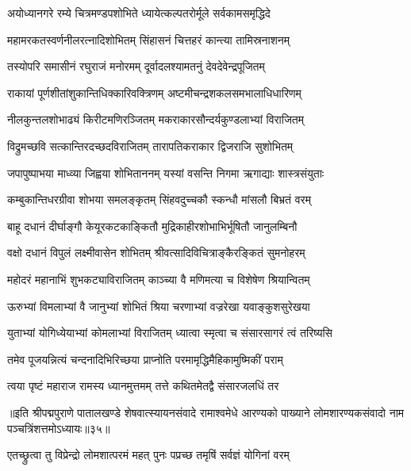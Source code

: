 \twolineshloka
{अयोध्यानगरे रम्ये चित्रमण्डपशोभिते}
{ध्यायेत्कल्पतरोर्मूले सर्वकामसमृद्धिदे}%

\twolineshloka
{महामरकतस्वर्णनीलरत्नादिशोभितम्}
{सिंहासनं चित्तहरं कान्त्या तामिस्रनाशनम्}%

\twolineshloka
{तस्योपरि समासीनं रघुराजं मनोरमम्}
{दूर्वादलश्यामतनुं देवदेवेन्द्रपूजितम्}%

\twolineshloka
{राकायां पूर्णशीतांशुकान्तिधिक्कारिवक्त्रिणम्}
{अष्टमीचन्द्रशकलसमभालाधिधारिणम्}%

\twolineshloka
{नीलकुन्तलशोभाढ्यं किरीटमणिरञ्जितम्}
{मकराकारसौन्दर्यकुण्डलाभ्यां विराजितम्}%

\twolineshloka
{विद्रुमच्छवि सत्कान्तिरदच्छदविराजितम्}
{तारापतिकराकार द्विजराजि सुशोभितम्}%

\twolineshloka
{जपापुष्पाभया माध्व्या जिह्वया शोभिताननम्}
{यस्यां वसन्ति निगमा ऋगाद्याः शास्त्रसंयुताः}%

\twolineshloka
{कम्बुकान्तिधरग्रीवा शोभया समलङ्कृतम्}
{सिंहवदुच्चकौ स्कन्धौ मांसलौ बिभ्रतं वरम्}%

\twolineshloka
{बाहू दधानं दीर्घाङ्गौ केयूरकटकाङ्कितौ}
{मुद्रिकाहीरशोभाभिर्भूषितौ जानुलम्बिनौ}%

\twolineshloka
{वक्षो दधानं विपुलं लक्ष्मीवासेन शोभितम्}
{श्रीवत्सादिविचित्राङ्कैरङ्कितं सुमनोहरम्}%

\twolineshloka
{महोदरं महानाभिं शुभकट्याविराजितम्}
{काञ्च्या वै मणिमत्या च विशेषेण श्रियान्वितम्}%

\twolineshloka
{ऊरुभ्यां विमलाभ्यां वै जानुभ्यां शोभितं श्रिया}
{चरणाभ्यां वज्ररेखा यवाङ्कुशसुरेखया}%

\twolineshloka
{युताभ्यां योगिध्येयाभ्यां कोमलाभ्यां विराजितम्}
{ध्यात्वा स्मृत्वा च संसारसागरं त्वं तरिष्यसि}%

\twolineshloka
{तमेव पूजयन्नित्यं चन्दनादिभिरिच्छया}
{प्राप्नोति परमामृद्धिमैहिकामुष्मिकीं पराम्}%

\twolineshloka
{त्वया पृष्टं महाराज रामस्य ध्यानमुत्तमम्}
{तत्ते कथितमेतद्वै संसारजलधिं तर}%

{॥इति श्रीपद्मपुराणे पातालखण्डे शेषवात्स्यायनसंवादे रामाश्वमेधे आरण्यको पाख्याने लोमशारण्यकसंवादो नाम पञ्चत्रिंशत्तमोऽध्यायः॥३५॥}



\twolineshloka
{एतच्छ्रुत्वा तु विप्रेन्द्रो लोमशात्परमं महत्}
{पुनः पप्रच्छ तमृषिं सर्वज्ञं योगिनां वरम्}%


